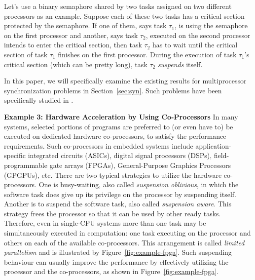 Let's use a binary semaphore shared by two tasks assigned on two different processors as an example. Suppose each of these two tasks has a critical section protected by the semaphore. If one of them, says task $\tau_1$, is using the semaphore on the first processor and another, says task $\tau_2$, executed on the second processor intends to enter the critical section, then task $\tau_2$ has to wait until the critical section of task $\tau_1$ finishes on the first processor. During the execution of task $\tau_1$'s critical section (which can be pretty long), task $\tau_2$ \emph{suspends} itself. 


In this paper, we will specifically examine the existing results for multiprocessor synchronization problems in Section~\ref{sec:syn}. Such problems have been specifically studied in \cite{rajkumar-1990,lakshmanan-2009,zeng-2011,bbb-2013,yang-2013,kim-2014,han-2014,carminati-2014,yang-2014}.

{\bf Example 3: Hardware Acceleration by Using Co-Processors} In many systems, selected portions of programs are preferred to (or even have to) be executed on dedicated hardware co-processors, to satisfy the performance requirements.  Such co-processors in embedded systems include application-specific integrated circuits (ASICs), digital signal processors (DSPs), field-programmable gate arrays (FPGAs), General-Purpose Graphics Processors (GPGPUs), etc. There are two typical strategies to utilize the hardware co-processors. One is busy-waiting, also called \emph{suspension oblivious}, in which the software task does give up its privilege on the processor by suspending itself. Another is to suspend the software task, also called \emph{suspension aware}. This strategy frees the processor so that it can be used by other ready tasks. Therefore, even in single-CPU systems more than one task may be simultaneously executed in computation: one task executing on the processor and others on each of the available co-processors. This arrangement is called \emph{limited parallelism} \cite{RTAS-AudsleyB04} and is illustrated by Figure~\ref{fig:example-fpga}. Such suspending behaviour can usually improve the performance by effectively utilizing the processor and the co-processors, as shown in Figure~\ref{fig:example-fpga}.

